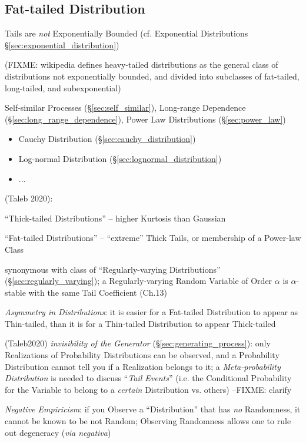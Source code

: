 \subsection{Fat-tailed Distribution}\label{sec:fat_tailed}

Tails are \emph{not} Exponentially Bounded (cf. Exponential Distributions
\S\ref{sec:exponential_distribution})

(FIXME: wikipedia defines heavy-tailed distributions as the general class of
distributions not exponentially bounded, and divided into subclasses of
fat-tailed, long-tailed, and subexponential)

\fist Self-similar Processes (\S\ref{sec:self_similar}), Long-range Dependence
(\S\ref{sec:long_range_dependence}), Power Law Distributions
(\S\ref{sec:power_law})

\begin{itemize}
  \item Cauchy Distribution (\S\ref{sec:cauchy_distribution})
  \item Log-normal Distribution (\S\ref{sec:lognormal_distribution})
  \item ...
\end{itemize}

(Taleb 2020):

``Thick-tailed Distributions'' -- higher Kurtosis than Gaussian

``Fat-tailed Distributions'' -- ``extreme'' Thick Tails, or membership of a
Power-law Class

synonymous with class of ``Regularly-varying Distributions''
(\S\ref{sec:regularly_varying}); a Regularly-varying Random Variable of Order
$\alpha$ is $\alpha$-stable with the same Tail Coefficient
(Ch.13)

\emph{Asymmetry in Distributions}: it is easier for a Fat-tailed Distribution to
appear as Thin-tailed, than it is for a Thin-tailed Distribution to appear
Thick-tailed

(Taleb2020) \emph{invisibility of the Generator}
(\S\ref{sec:generating_process}): only Realizations of Probability Distributions
can be observed, and a Probability Distribution cannot tell you if a Realization
belongs to it; a \emph{Meta-probability Distribution} is needed to discuss
``\emph{Tail Events}'' (i.e. the Conditional Probability for the Variable to
belong to a \emph{certain} Distribution vs. others) --FIXME: clarify

\emph{Negative Empiricism}: if you Observe a ``Distribution'' that has \emph{no}
Randomness, it cannot be known to be not Random; Observing Randomness allows one
to rule out degeneracy (\emph{via negativa})

